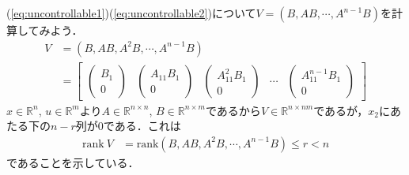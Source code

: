 \begin{frame}[t]
(\ref{eq:uncontrollable1})(\ref{eq:uncontrollable2})について$V=(B,AB,\cdots, A^{n-1}B)$を計算してみよう．
\begin{align}
 V & = (B, AB, A^{2}B, \cdots, A^{n-1}B)
\nonumber \\
   & = \left[
          \begin{array}{ccccc}
             \left(
                \begin{array}{c}
                   B_1 \\
                   0
                \end{array}
             \right)
             &
             \left(
                \begin{array}{c}
                   A_{11} B_1 \\
                   0
                \end{array}
             \right)
             &
             \left(
                \begin{array}{c}
                   A_{11}^2 B_1 \\
                   0
                \end{array}
             \right)
             &
             \cdots
             &
             \left(
                \begin{array}{c}
                   A_{11}^{n-1} B_1 \\
                   0
                \end{array}
             \right)
          \end{array}
       \right]
\end{align}
$x \in {\mathbb R}^n$, $ u \in {\mathbb R}^m $より$A\in {\mathbb R}^{n \times n}$, $B \in {\mathbb R}^{n \times m}$であるから$V \in {\mathbb R}^{n \times nm}$であるが，$x_2$にあたる下の$n-r$列が$0$である．これは
\begin{align}
 \mbox{rank}\ V &= \mbox{rank}  (B, AB, A^{2}B, \cdots, A^{n-1}B) \leq r < n
\end{align}
であることを示している．
\end{frame}


